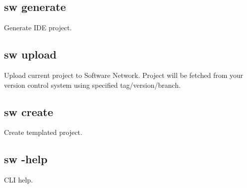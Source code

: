 \subsection{sw generate}

Generate IDE project.

\subsection{sw upload}

Upload current project to Software Network.
Project will be fetched from your version control system using specified tag/version/branch.

\subsection{sw create}

Create templated project.

\subsection{sw -help}

CLI help.

